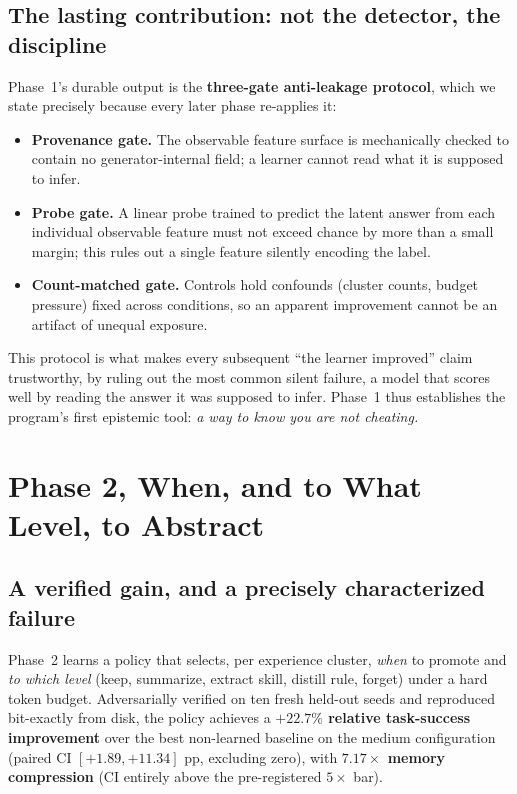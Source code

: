 \documentclass[11pt]{article}
\begin{document}
\subsection{The lasting contribution: not the detector, the discipline}
Phase~1's durable output is the \textbf{three-gate anti-leakage protocol}, which we
state precisely because every later phase re-applies it:
\begin{itemize}
\item \textbf{Provenance gate.} The observable feature surface is mechanically checked
to contain no generator-internal field; a learner cannot read what it is supposed to
infer.
\item \textbf{Probe gate.} A linear probe trained to predict the latent answer from
each individual observable feature must not exceed chance by more than a small margin;
this rules out a single feature silently encoding the label.
\item \textbf{Count-matched gate.} Controls hold confounds (cluster counts, budget
pressure) fixed across conditions, so an apparent improvement cannot be an artifact of
unequal exposure.
\end{itemize}
This protocol is what makes every subsequent ``the learner improved'' claim
trustworthy, by ruling out the most common silent failure, a model that scores well
by reading the answer it was supposed to infer. Phase~1 thus establishes the program's
first epistemic tool: \emph{a way to know you are not cheating.}

\section{Phase 2, When, and to What Level, to Abstract}
\label{sec:p2}

\subsection{A verified gain, and a precisely characterized failure}
Phase~2 learns a policy that selects, per experience cluster, \emph{when} to promote
and \emph{to which level} (keep, summarize, extract skill, distill rule, forget)
under a hard token budget. Adversarially verified on ten fresh held-out seeds and
reproduced bit-exactly from disk, the policy achieves a \textbf{$+22.7\%$ relative
task-success improvement} over the best non-learned baseline on the medium
configuration (paired CI $[+1.89,+11.34]$ pp, excluding zero), with
\textbf{$7.17\times$ memory compression} (CI entirely above the pre-registered
$5\times$ bar).
\end{document}
